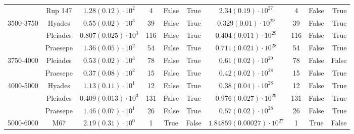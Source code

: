 \begin{tabular}{lccccccccr}
          & Rup 147 &    $1.28\left(0.12\right)\cdot 10^{2}$ &              4 &           False &            True &        $2.34\left(0.19\right)\cdot 10^{27}$ &                4 &             False &              True \\
3500-3750 & Hyades &    $0.55\left(0.02\right)\cdot 10^{3}$ &             39 &           False &            True &       $0.329\left(0.01\right)\cdot 10^{29}$ &               39 &             False &              True \\
          & Pleiades &  $0.807\left(0.025\right)\cdot 10^{3}$ &            116 &           False &            True &      $0.404\left(0.011\right)\cdot 10^{29}$ &              116 &             False &              True \\
          & Praesepe &    $1.36\left(0.05\right)\cdot 10^{2}$ &             54 &           False &            True &      $0.711\left(0.021\right)\cdot 10^{28}$ &               54 &             False &              True \\
3750-4000 & Pleiades &    $0.53\left(0.02\right)\cdot 10^{3}$ &             78 &           False &            True &        $0.61\left(0.02\right)\cdot 10^{29}$ &               78 &             False &             False \\
          & Praesepe &    $0.37\left(0.08\right)\cdot 10^{2}$ &             15 &           False &            True &        $0.42\left(0.02\right)\cdot 10^{28}$ &               15 &             False &              True \\
4000-5000 & Hyades &    $1.13\left(0.11\right)\cdot 10^{1}$ &             12 &           False &            True &        $0.38\left(0.04\right)\cdot 10^{28}$ &               12 &             False &              True \\
          & Pleiades &  $0.409\left(0.013\right)\cdot 10^{3}$ &            131 &           False &            True &      $0.976\left(0.027\right)\cdot 10^{29}$ &              131 &             False &              True \\
          & Praesepe &    $1.46\left(0.07\right)\cdot 10^{1}$ &             26 &           False &            True &        $0.57\left(0.02\right)\cdot 10^{28}$ &               26 &             False &              True \\
5000-6000 & M67 &    $2.19\left(0.31\right)\cdot 10^{0}$ &              1 &            True &           False &  $1.84859\left(0.00027\right)\cdot 10^{27}$ &                1 &              True &             False \\

\end{tabular}
